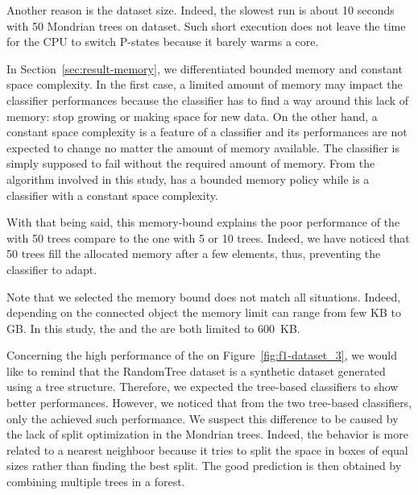 Another reason is the dataset size. Indeed, the slowest run is about
10 seconds with 50 Mondrian trees on \recofitdataset dataset.  Such short
execution does not leave the time for the CPU to switch P-states because it
barely warms a core.

In Section~\ref{sec:result-memory}, we differentiated bounded memory and
constant space complexity. In the first case, a limited amount of memory
may impact the classifier performances because the classifier has to find a way
around this lack of memory: stop growing or making space for new data.
On the other hand, a constant space complexity is a feature of a classifier and
its performances are not expected to change no  matter the amount of memory
available. The classifier is simply supposed to fail without the required
amount of memory. From the algorithm involved in this study, \mondrianforest
has a bounded memory policy while \naivebayes is a classifier with a constant
space complexity.

With that being said, this memory-bound explains the poor performance of the
\mondrianforest with 50 trees compare to the one with 5 or 10 trees. Indeed, we
have noticed that 50 trees fill the allocated memory after a few elements,
thus, preventing the classifier to adapt.  

Note that we selected the memory bound does not match all situations. Indeed,
depending on the connected object the memory limit can range from few KB to GB.
In this study, the \mondrianforest and the \FNN are both limited to 600~KB.

Concerning the high performance of the \hoeffdingtree on
Figure~\ref{fig:f1-dataset_3}, we would like to remind that the RandomTree
dataset is a synthetic dataset generated using a tree structure. Therefore, we
expected the tree-based classifiers to show better performances.  However, we
noticed that from the two tree-based classifiers, only the \hoeffdingtree
achieved such performance.  We suspect this difference to be caused by the lack
of split optimization in the Mondrian trees. Indeed, the \mondrianforest behavior is
more related to a nearest neighboor because it tries to split the space in
boxes of equal sizes rather than finding the best split. The good prediction is
then obtained by combining multiple trees in a forest.

